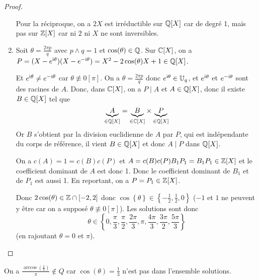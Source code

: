 \documentclass[12pt]{article}
\begin{document}
\begin{proof}
\begin{enumerate}
		Pour la réciproque, on a $2X$ est irréductible sur $\mathbb{Q}[X]$ car de degré 1, mais pas sur $\mathbb{Z}[X]$ car ni 2 ni $X$ ne sont inversibles.

		\item Soit $\theta=\frac{2\pi p}{q}$ avec $p\wedge q=1$ et $\cos(\theta)\in\mathbb{Q}$. Sur $\mathbb{C}[X]$, on a $P=(X-e^{\mathrm{i}\theta})(X-e^{-\mathrm{i}\theta})=X^{2}-2\cos(\theta)X+1\in\mathbb{Q}[X]$.
		
		Et $e^{\mathrm{i}\theta}\neq e^{-\mathrm{i}\theta}$ car $\theta\not\equiv0[\pi]$. On a $\theta=\frac{2\pi p}{q}$ donc $e^{\mathrm{i}\theta}\in \mathbb{U}_{q}$, et $e^{\mathrm{i}\theta}$ et $e^{-\mathrm{i}\theta}$ sont des racines de $A$. Donc, dans $\mathbb{C}[X]$, on a $P\mid A$ et $A\in\mathbb{Q}[X]$, donc il existe $B\in\mathbb{Q}[X]$ tel que 
		\begin{equation}
			\underbrace{A}_{\in\mathbb{Q}[X]}=\underbrace{B}_{\in\mathbb{C}[X]}\times\underbrace{P}_{\in\mathbb{Q}[X]}
		\end{equation}
		Or $B$ s'obtient par la division euclidienne de $A$ par $P$, qui est indépendante du corps de référence, il vient $B\in\mathbb{Q}[X]$ et donc $A\mid P$ dans $\mathbb{Q}[X]$.

		On a $c(A)=1=c(B)c(P)$ et $A=c(B)c(P)B_{1}P_{1}=B_{1}P_{1}\in\mathbb{Z}[X]$ et le coefficient dominant de $A$ est donc 1. Donc le coefficient dominant de $B_{1}$ et de $P_{1}$ est aussi 1. En reportant, on a $P=P_{1}\in\mathbb{Z}[X]$.

		Donc $2\cos(\theta)\in\mathbb{Z}\cap[-2,2]$ donc $\cos\left\{\theta\right\}\in\left\{-\frac{1}{2},\frac{1}{2},0\right\}$ ($-1$ et $1$ ne peuvent y être car on a supposé $\theta\not\equiv0[\pi]$). Les solutions sont donc 
		\begin{equation}
			\boxed{
			\theta\in\left\{0,\frac{\pi}{3},\frac{\pi}{2},\frac{2\pi}{3},\pi,\frac{4\pi}{3},\frac{3\pi}{2},\frac{5\pi}{3}\right\}}
		\end{equation}
		(en rajoutant $\theta=0$ et $\pi$).
	\end{enumerate}
\end{proof}

\begin{remark}
	On a $\frac{\arccos(\frac{1}{3})}{\pi}\notin Q$ car $\cos(\theta)=\frac{1}{3}$ n'est pas dans l'ensemble solutions.
\end{remark}
\end{document}
